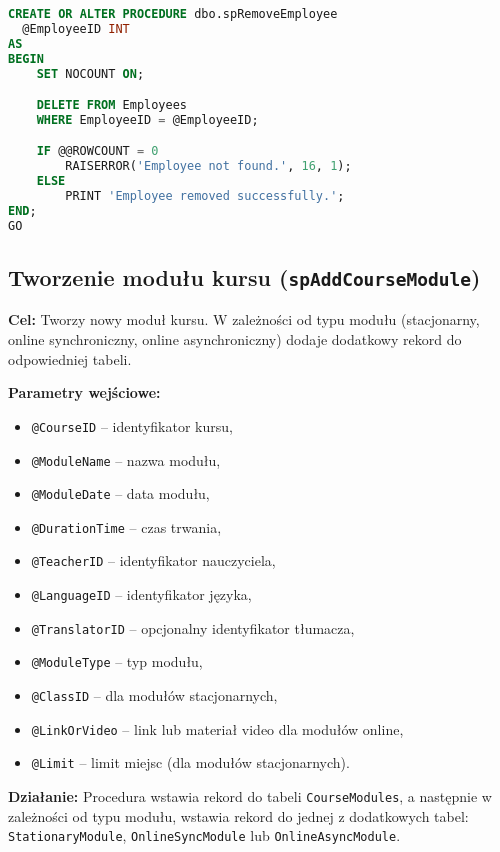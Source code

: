 \documentclass[12pt]{article}
\begin{document}
\begin{lstlisting}[language=SQL]
CREATE OR ALTER PROCEDURE dbo.spRemoveEmployee
  @EmployeeID INT
AS
BEGIN
    SET NOCOUNT ON;

    DELETE FROM Employees
    WHERE EmployeeID = @EmployeeID;

    IF @@ROWCOUNT = 0
        RAISERROR('Employee not found.', 16, 1);
    ELSE
        PRINT 'Employee removed successfully.';
END;
GO
\end{lstlisting}

\newpage
\subsection{Tworzenie modułu kursu (\texttt{spAddCourseModule})}
\textbf{Cel:} Tworzy nowy moduł kursu. W zależności od typu modułu (stacjonarny, online synchroniczny, online asynchroniczny) dodaje dodatkowy rekord do odpowiedniej tabeli.

\textbf{Parametry wejściowe:}
\begin{itemize}
  \item \verb|@CourseID| – identyfikator kursu,
  \item \verb|@ModuleName| – nazwa modułu,
  \item \verb|@ModuleDate| – data modułu,
  \item \verb|@DurationTime| – czas trwania,
  \item \verb|@TeacherID| – identyfikator nauczyciela,
  \item \verb|@LanguageID| – identyfikator języka,
  \item \verb|@TranslatorID| – opcjonalny identyfikator tłumacza,
  \item \verb|@ModuleType| – typ modułu,
  \item \verb|@ClassID| – dla modułów stacjonarnych,
  \item \verb|@LinkOrVideo| – link lub materiał video dla modułów online,
  \item \verb|@Limit| – limit miejsc (dla modułów stacjonarnych).
\end{itemize}

\textbf{Działanie:} Procedura wstawia rekord do tabeli \verb|CourseModules|, a następnie w zależności od typu modułu, wstawia rekord do jednej z dodatkowych tabel: \verb|StationaryModule|, \verb|OnlineSyncModule| lub \verb|OnlineAsyncModule|.
\end{document}

